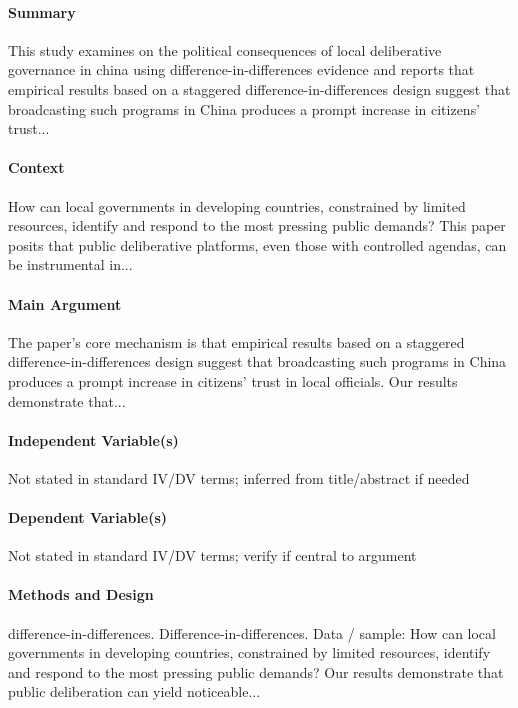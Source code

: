 \documentclass[12pt]{article}
\begin{document}
\paragraph{Summary} This study examines on the political consequences of local deliberative governance in china using difference-in-differences evidence and reports that empirical results based on a staggered difference-in-differences design suggest that broadcasting such programs in China produces a prompt increase in citizens' trust...

\paragraph{Context} How can local governments in developing countries, constrained by limited resources, identify and respond to the most pressing public demands? This paper posits that public deliberative platforms, even those with controlled agendas, can be instrumental in...

\paragraph{Main Argument} The paper's core mechanism is that empirical results based on a staggered difference-in-differences design suggest that broadcasting such programs in China produces a prompt increase in citizens' trust in local officials. Our results demonstrate that...

\paragraph{Independent Variable(s)} Not stated in standard IV/DV terms; inferred from title/abstract if needed

\paragraph{Dependent Variable(s)} Not stated in standard IV/DV terms; verify if central to argument

\paragraph{Methods and Design} difference-in-differences. Difference-in-differences. Data / sample: How can local governments in developing countries, constrained by limited resources, identify and respond to the most pressing public demands? Our results demonstrate that public deliberation can yield noticeable...
\end{document}
